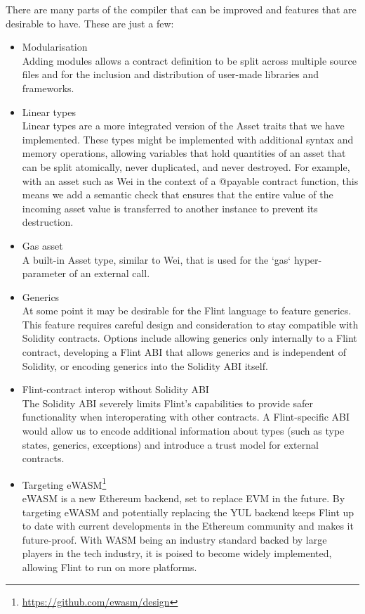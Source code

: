 There are many parts of the compiler that can be improved and features that are desirable to have. These are just a few:

\begin{itemize}
	\item Modularisation\\
Adding modules allows a contract definition to be split across multiple source files and for the inclusion and distribution of user-made libraries and frameworks.
	\item Linear types\\
Linear types are a more integrated version of the Asset traits that we have implemented. These types might be implemented with additional syntax and memory operations, allowing variables that hold quantities of an asset that can be split atomically, never duplicated, and never destroyed. For example, with an asset such as Wei in the context of a @payable contract function, this means we add a semantic check that ensures that the entire value of the incoming asset value is transferred to another instance to prevent its destruction.
	\item Gas asset\\
A built-in Asset type, similar to Wei, that is used for the `gas` hyper-parameter of an external call.
	\item Generics\\
At some point it may be desirable for the Flint language to feature generics. This feature requires careful design and consideration to stay compatible with Solidity contracts. Options include allowing generics only internally to a Flint contract, developing a Flint ABI that allows generics and is independent of Solidity, or encoding generics into the Solidity ABI itself.
	\item Flint-contract interop without Solidity ABI\\
The Solidity ABI severely limits Flint's capabilities to provide safer functionality when interoperating with other contracts. A Flint-specific ABI would allow us to encode additional information about types (such as type states, generics, exceptions) and introduce a trust model for external contracts.
	\item Targeting eWASM\footnote{\url{https://github.com/ewasm/design}}\\
eWASM is a new Ethereum backend, set to replace EVM in the future. By targeting eWASM and potentially replacing the YUL backend keeps Flint up to date with current developments in the Ethereum community and makes it future-proof. With WASM being an industry standard backed by large players in the tech industry, it is poised to become widely implemented, allowing Flint to run on more platforms.

\end{itemize}
